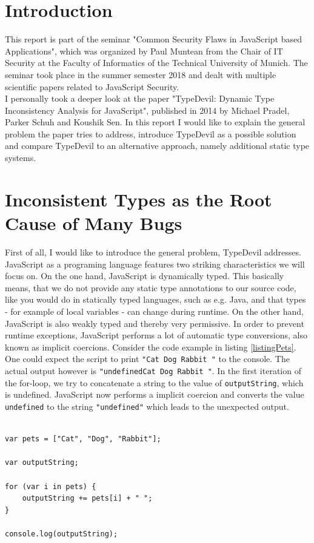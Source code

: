 \documentclass[runningheads,a4paper]{llncs}
\begin{document}
\newpage

\section{Introduction}

This report is part of the seminar "Common Security Flaws in JavaScript based Applications", which was organized by Paul Muntean from the Chair of IT Security at the Faculty of Informatics of the Technical University of Munich.
The seminar took place in the summer semester 2018 and dealt with multiple scientific papers related to JavaScript Security. \\
I personally took a deeper look at the paper "TypeDevil: Dynamic Type Inconsistency Analysis for JavaScript", published in 2014 by Michael Pradel, Parker Schuh and Koushik Sen.
In this report I would like to explain the general problem the paper tries to address, introduce TypeDevil as a possible solution and compare TypeDevil to an alternative approach, namely additional static type systems. 

\section{Inconsistent Types as the Root Cause of Many Bugs}
First of all, I would like to introduce the general problem, TypeDevil addresses. \\
JavaScript as a programing language features two striking characteristics we will focus on. 
On the one hand, JavaScript is dynamically typed. 
This basically means, that we do not provide any static type annotations to our source code, like you would do in statically typed languages, such as e.g. Java, and that types - for example of local variables - can change during runtime.
On the other hand, JavaScript is also weakly typed and thereby very permissive. In order to prevent runtime exceptions, JavaScript performs a lot of automatic type conversions, also known as implicit coercions.
Consider the code example in listing \ref{listingPets}. 
One could expect the script to print \lstinline[columns=fixed]{"Cat Dog Rabbit "} to the console.
The actual output however is \lstinline[columns=fixed]{"undefinedCat Dog Rabbit "}. 
In the first iteration of the for-loop, we try to concatenate a string to the value of \lstinline[columns=fixed]{outputString}, which is undefined. 
JavaScript now performs a implicit coercion and converts the value \lstinline[columns=fixed]{undefined} to the string \lstinline[columns=fixed]{"undefined"} which leads to the unexpected output.
\\ \\
\lstset{language=javascript}
\begin{minipage}{\linewidth}
\begin{lstlisting}[frame=single, caption=Implicit Coercions, label={listingPets}] 
var pets = ["Cat", "Dog", "Rabbit"];

var outputString;

for (var i in pets) {
    outputString += pets[i] + " ";
}

console.log(outputString);
\end{lstlisting}
\end{minipage}
\end{document}
